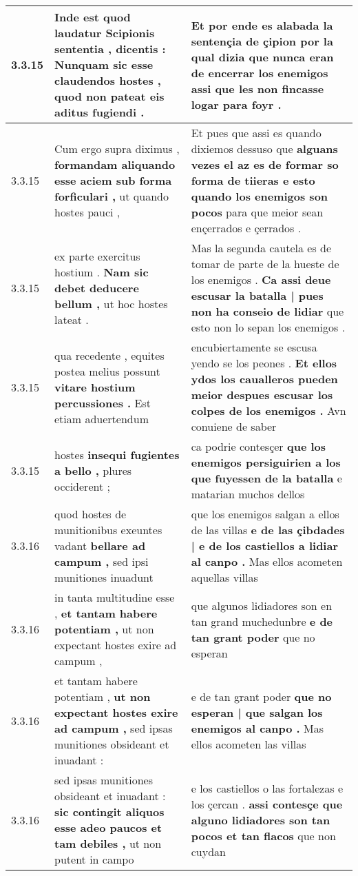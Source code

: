 \begin{tabular}{|p{1cm}|p{6.5cm}|p{6.5cm}|}
3.3.15 & Inde est quod laudatur Scipionis sententia , dicentis : \textbf{ Nunquam sic esse claudendos hostes , } quod non pateat eis aditus fugiendi . & Et por ende es alabada la sentençia de çipion \textbf{ por la qual dizia que nunca eran de encerrar los enemigos } assi que les non fincasse logar para foyr . \\\hline
3.3.15 & Cum ergo supra diximus , \textbf{ formandam aliquando esse aciem sub forma forficulari , } ut quando hostes pauci , & Et pues que assi es quando dixiemos dessuso que \textbf{ alguans vezes el az es de formar so forma de tiieras e esto quando los enemigos son pocos } para que meior sean ençerrados e çerrados . \\\hline
3.3.15 & ex parte exercitus hostium . \textbf{ Nam sic debet deducere bellum , } ut hoc hostes lateat . & Mas la segunda cautela es de tomar de parte de la hueste de los enemigos . \textbf{ Ca assi deue escusar la batalla | pues non ha conseio de lidiar } que esto non lo sepan los enemigos . \\\hline
3.3.15 & qua recedente , equites postea melius possunt \textbf{ vitare hostium percussiones . } Est etiam aduertendum & encubiertamente se escusa yendo se los peones . \textbf{ Et ellos ydos los caualleros pueden meior despues escusar los colpes de los enemigos . } Avn conuiene de saber \\\hline
3.3.15 & hostes \textbf{ insequi fugientes a bello , } plures occiderent ; & ca podrie contesçer \textbf{ que los enemigos persiguirien a los que fuyessen de la batalla } e matarian muchos dellos \\\hline
3.3.16 & quod hostes de munitionibus exeuntes vadant \textbf{ bellare ad campum , } sed ipsi munitiones inuadunt & que los enemigos salgan a ellos de las villas \textbf{ e de las çibdades | e de los castiellos a lidiar al canpo . } Mas ellos acometen aquellas villas \\\hline
3.3.16 & in tanta multitudine esse , \textbf{ et tantam habere potentiam , } ut non expectant hostes exire ad campum , & que algunos lidiadores son en tan grand muchedunbre \textbf{ e de tan grant poder } que no esperan \\\hline
3.3.16 & et tantam habere potentiam , \textbf{ ut non expectant hostes exire ad campum , } sed ipsas munitiones obsideant et inuadant : & e de tan grant poder \textbf{ que no esperan | que salgan los enemigos al canpo . } Mas ellos acometen las villas \\\hline
3.3.16 & sed ipsas munitiones obsideant et inuadant : \textbf{ sic contingit aliquos esse adeo paucos et tam debiles , } ut non putent in campo & e los castiellos o las fortalezas e los çercan . \textbf{ assi contesçe que alguno lidiadores son tan pocos et tan flacos } que non cuydan \\\hline

\end{tabular}
